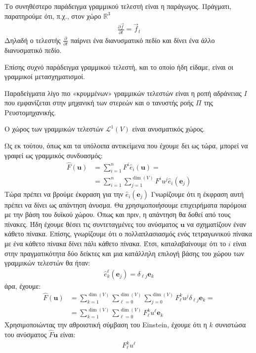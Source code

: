 \documentclass[main.tex]{subfiles}
\begin{document}
	Το συνηθέστερο παράδειγμα γραμμικού τελεστή είναι η παράγωγος. Πράγματι, παρατηρούμε ότι, π.χ., στον χώρο $\mathbb{R}^3$
	\begin{align*}
		\frac{\partial\vec{f}}{\partial t} = \vec{f}_t
	\end{align*}
	Δηλαδή ο τελεστής $\frac{\partial}{\partial t}$ παίρνει ένα διανυσματικό πεδίο και δίνει ένα άλλο διανυσματικό πεδίο.
	
	Επίσης συχνό παράδειγμα γραμμικού τελεστή, και το οποίο ήδη είδαμε, είναι οι γραμμικοί μετασχηματισμοί.
	
	Παραδείγματα λίγο πιο «κρυμμένων» γραμμικών τελεστών είναι η ροπή αδράνειας $I$ που εμφανίζεται στην μηχανική των στερεών και ο τανυστής ροής $\Pi$ της Ρευστομηχανικής.
	
	\begin{corollary}
		Ο χώρος των γραμμικών τελεστών $\mathcal{L}^1(V)$ είναι ανυσματικός χώρος.
	\end{corollary}
	
	Ως εκ τούτου, όπως και τα υπόλοιπα αντικείμενα που έχουμε δει ως τώρα, μπορεί να γραφεί ως γραμμικός συνδυασμός:
	\begin{align*}
		\hat{F}(\boldsymbol{u}) &= \sum_{i=1}^{n}F^i\hat{e}_i(\boldsymbol{u}) =\\
		&= \sum_{i=1}^{n}\sum_{j=1}^{\dim(V)}F^iu^j\hat{e}_i(\boldsymbol{e}_j)
 	\end{align*}
 	Τώρα πρέπει να βρούμε έκφραση για την $\hat{e}_i(\boldsymbol{e}_j)$ Γνωρίζουμε ότι η έκφραση αυτή πρέπει να δίνει ως απάντηση άνυσμα. Θα χρησιμοποιήσουμε επιχειρήματα παρόμοια με την βάση του δυϊκού χώρου. Όπως και πριν, η απάντηση θα δοθεί από τους πίνακες. Ήδη έχουμε θέσει τις συντεταγμένες του ανύσματος $\boldsymbol{u}$ να σχηματίζουν έναν κάθετο πίνακα. Επίσης, γνωρίζουμε ότι ο πολλαπλασιασμός ενός τετραγωνικού πίνακα με ένα κάθετο πίνακα δίνει πάλι κάθετο πίνακα. Έτσι, καταλαβαίνουμε ότι το $i$ είναι στην πραγματικότητα δύο δείκτες και μια κατάλληλη επιλογή βάσης του χώρου των γραμμικών τελεστών θα ήταν:
 	\begin{align*}
 		\hat{e}_k^\ell(\boldsymbol{e}_j) = \delta_{\ell j}\boldsymbol{e}_k
 	\end{align*}
	άρα, έχουμε:
	\begin{align*}
		\hat{F}(\boldsymbol{u}) &= \sum_{k=1}^{\dim(V)}\sum_{\ell=0}^{\dim(V)}\sum_{j=0}^{\dim(V)}F^k_\ell u^j\delta_{\ell j}\boldsymbol{e}_k =\\
		&= \sum_{k=1}^{\dim(V)}\sum_{\ell=0}^{\dim(V)}F^k_\ell u^\ell\boldsymbol{e}_k
	\end{align*}
	Χρησιμοποιώντας την αθροιστική σύμβαση του Einstein, έχουμε ότι η $k$ συνιστώσα του ανύσματος $\hat{F}\boldsymbol{u}$ είναι:
	\begin{align*}
		F^k_\ell u^\ell
	\end{align*}
	
\end{document}
